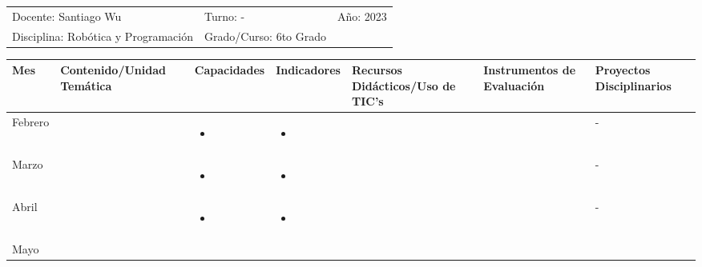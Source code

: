 \documentclass[landscape, a4paper, 10pt]{article}
\newcommand{\smallcellwidth}{0.7in}
\newcommand{\normalcellwidth}{1.2in}
\newcommand{\bigcellwidth}{2.0in}
\newcommand{\profesor}{Santiago Wu}
\newcommand{\discipline}{Robótica y Programación}
\newcommand{\currentyear}{2023}
\begin{document}
	\pagebreak[4]
	\begin{tabularx}{\textwidth}{ >{\raggedright\arraybackslash}X >{\raggedright\arraybackslash}X >{\raggedright\arraybackslash}X }
		Docente: \profesor &
		Turno: - &
		Año: \currentyear \\
		Disciplina: \discipline &
		Grado/Curso: 6to Grado &
		 \\
	\end{tabularx}
	\centering
	\begin{longtable}{|m{\smallcellwidth}|p{\normalcellwidth}|p{\bigcellwidth}|p{\bigcellwidth}|p{\normalcellwidth}|p{\normalcellwidth}|p{\normalcellwidth}|}
		\hline
		\textbf{Mes} &
		\textbf{Contenido/Unidad Temática} &
		\textbf{Capacidades} &
		\textbf{Indicadores} &
		\textbf{Recursos Didácticos/Uso de TIC's} &
		\textbf{Instrumentos de Evaluación} &
		\textbf{Proyectos Disciplinarios} \\
		\hline
		\endhead
		Febrero &
		 &
		\begin{itemize}
			\item 
		\end{itemize} &
		\begin{itemize}
			\item 
		\end{itemize} &
		  &
		  &
		 - \\
		\hline
		Marzo &
		 &
		\begin{itemize}
			\item 
		\end{itemize} &
		\begin{itemize}
			\item 
		\end{itemize} &
		  &
		  &
		 - \\
		\hline
		Abril &
		 &
		\begin{itemize}
			\item 
		\end{itemize} &
		\begin{itemize}
			\item 
		\end{itemize} &
		  &
		  &
		 - \\
		\hline
		Mayo &
		 &
		\begin{itemize}

\end{itemize}
\end{longtable}
\end{document}
